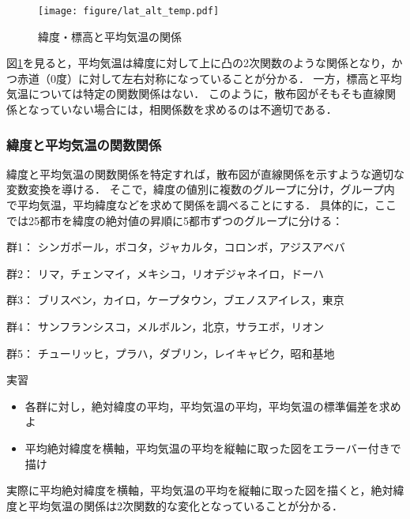 %
\begin{figure}[H]
	\centering
	\texttt{[image: figure/lat\_alt\_temp.pdf]}
	\caption{緯度・標高と平均気温の関係}
	\label{fig:lat_alt_temp}
\end{figure}
%

%
図\ref{fig:lat_alt_temp}を見ると，平均気温は緯度に対して上に凸の2次関数のような関係となり，かつ赤道（0度）に対して左右対称になっていることが分かる．
%
一方，標高と平均気温については特定の関数関係はない．
%
このように，散布図がそもそも直線関係となっていない場合には，相関係数を求めるのは不適切である．
%
%

\subsubsection*{緯度と平均気温の関数関係}
%
緯度と平均気温の関数関係を特定すれば，散布図が直線関係を示すような適切な変数変換を導ける．
%
そこで，緯度の値別に複数のグループに分け，グループ内で平均気温，平均緯度などを求めて関係を調べることにする．
%
具体的に，ここでは25都市を緯度の絶対値の昇順に5都市ずつのグループに分ける：
%
\begin{description}
\item{群1：}
シンガポール，ボコタ，ジャカルタ，コロンボ，アジスアベバ
\item{群2：}
リマ，チェンマイ，メキシコ，リオデジャネイロ，ドーハ
\item{群3：}
ブリスベン，カイロ，ケープタウン，ブエノスアイレス，東京
\item{群4：}
サンフランシスコ，メルボルン，北京，サラエボ，リオン
\item{群5：}
チューリッヒ，プラハ，ダブリン，レイキャビク，昭和基地
\end{description}
%

%
\begin{itembox}[l]{実習}
%
\begin{itemize}
\item
各群に対し，絶対緯度の平均，平均気温の平均，平均気温の標準偏差を求めよ
\item
平均絶対緯度を横軸，平均気温の平均を縦軸に取った図をエラーバー付きで描け
\end{itemize}
%
\end{itembox}
%

\vspace{0.5cm}
%
実際に平均絶対緯度を横軸，平均気温の平均を縦軸に取った図を描くと，絶対緯度と平均気温の関係は2次関数的な変化となっていることが分かる．

